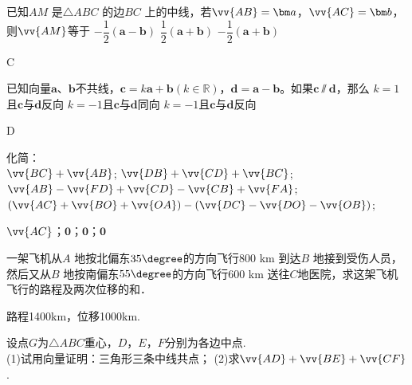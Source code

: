 \begin{exercise}
      已知$AM$ 是$\triangle ABC$ 的边$BC$ 上的中线，若$\vv{AB}=\bm a$，$\vv{AC}=\bm b$，则$\vv{AM}$等于\xz
        {$-\dfrac12(\bm a-\bm b)$}
        {$\dfrac12(\bm a+\bm b)$}
        {$-\dfrac12(\bm a+\bm b)$}
      \begin{answer}
        C
      \end{answer}
    \item%
      已知向量$\bm a$、$\bm b$不共线，$\bm c=k\bm a+\bm b({k\in\mathbb{R}})$，$\bm d=\bm a-\bm b$。如果$\bm c\varparallel \bm d$，那么\xz
        {$k=1$且$\bm c$与$\bm d$反向}
        {$k=-1$且$\bm c$与$\bm d$同向}
        {$k=-1$且$\bm c$与$\bm d$反向}
      \begin{answer}
        D
      \end{answer}
    \item%
      化简：\\
       $\vv{BC}+\vv{AB}$; \hspace{2em}  $\vv{DB}+\vv{CD}+\vv{BC}$;\\
       $\vv{AB}-\vv{FD}+\vv{CD}-\vv{CB}+\vv{FA}$;\hspace{2em}  $(\vv{AC}+\vv{BO}+\vv{OA})-(\vv{DC}-\vv{DO}-\vv{OB})$;\\
      \begin{answer}
        $\vv{AC}$；$\bm 0$；$\bm 0$；$\bm 0$
      \end{answer}
    \vspace{1.5cm}
    \item%
      一架飞机从$A$ 地按北偏东$35\degree$的方向飞行800 km 到达$B$ 地接到受伤人员，然后又从$B$ 地按南偏东$55\degree$的方向飞行600 km 送往$C $地医院，求这架飞机飞行的路程及两次位移的和．
      \begin{answer}
        路程1400km，位移1000km.
      \end{answer}
    \vspace{4cm}
    \item
      设点$G$为$\triangle ABC$重心，$D$，$E$，$F$分别为各边中点.\\
      (1)试用向量证明：三角形三条中线共点；
      (2)求$\vv{AD}+\vv{BE}+\vv{CF}$.
      \begin{flushright}
\end{flushright}
\end{exercise}
